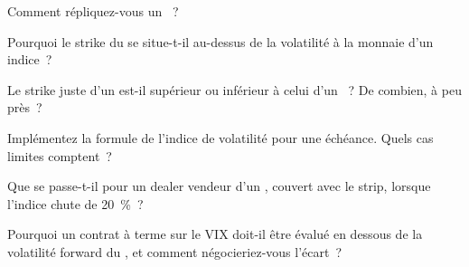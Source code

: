 \begin{interviewq}\label{iq:dv:variance-swaps-and-volatility-derivatives:1}
Comment répliquez-vous un ~?
\end{interviewq}

\begin{interviewq}\label{iq:dv:variance-swaps-and-volatility-derivatives:2}
Pourquoi le strike du  se situe-t-il au-dessus de la volatilité à la monnaie d'un indice~?
\end{interviewq}

\begin{interviewq}\label{iq:dv:variance-swaps-and-volatility-derivatives:3}
Le strike juste d'un  est-il supérieur ou inférieur à celui d'un ~? De combien, à peu près~?
\end{interviewq}

\begin{interviewq}\label{iq:dv:variance-swaps-and-volatility-derivatives:4}
Implémentez la formule de l'indice de volatilité pour une échéance. Quels cas limites comptent~?
\end{interviewq}

\begin{interviewq}\label{iq:dv:variance-swaps-and-volatility-derivatives:5}
Que se passe-t-il pour un dealer vendeur d'un , couvert avec le strip, lorsque l'indice chute de 20~\%~?
\end{interviewq}

\begin{interviewq}\label{iq:dv:variance-swaps-and-volatility-derivatives:6}
Pourquoi un contrat à terme sur le VIX doit-il être évalué en dessous de la volatilité forward du , et comment négocieriez-vous l'écart~?
\end{interviewq}
